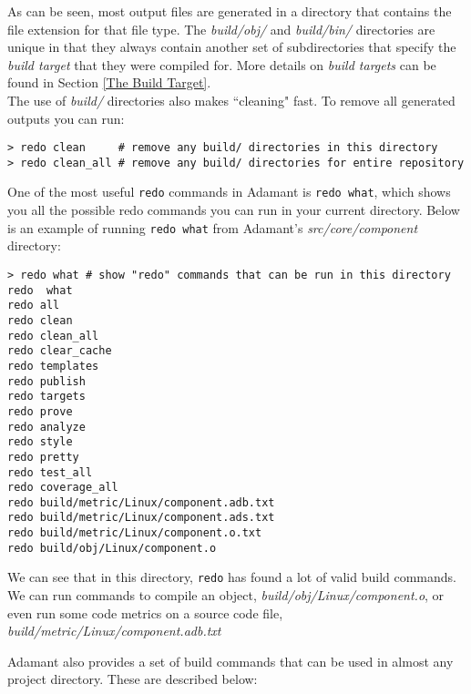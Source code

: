 As can be seen, most output files are generated in a directory that contains the file extension for that file type. The \textit{build/obj/} and \textit{build/bin/} directories are unique in that they always contain another set of subdirectories that specify the \textit{build target} that they were compiled for. More details on \textit{build targets} can be found in Section \ref{The Build Target}. \\

The use of \textit{build/} directories also makes ``cleaning" fast. To remove all generated outputs you can run:

\vspace{5mm} %
\begin{verbatim}
> redo clean     # remove any build/ directories in this directory
> redo clean_all # remove any build/ directories for entire repository
\end{verbatim}
\vspace{5mm} %

One of the most useful \texttt{redo} commands in Adamant is \texttt{redo what}, which shows you all the possible redo commands you can run in your current directory. Below is an example of running \texttt{redo what} from Adamant's \textit{src/core/component} directory:

\vspace{5mm} %
\begin{verbatim}
> redo what # show "redo" commands that can be run in this directory
redo  what
redo all
redo clean
redo clean_all
redo clear_cache
redo templates
redo publish
redo targets
redo prove
redo analyze
redo style
redo pretty
redo test_all
redo coverage_all
redo build/metric/Linux/component.adb.txt
redo build/metric/Linux/component.ads.txt
redo build/metric/Linux/component.o.txt
redo build/obj/Linux/component.o
\end{verbatim}
\vspace{5mm} %

We can see that in this directory, \texttt{redo} has found a lot of valid build commands. We can run commands to compile an object, \textit{build/obj/Linux/component.o}, or even run some code metrics on a source code file, \textit{build/metric/Linux/component.adb.txt}

Adamant also provides a set of build commands that can be used in almost any project directory. These are described below:

